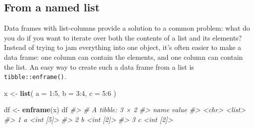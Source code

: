\documentclass[]{book}
\newenvironment{Shaded}{\begin{snugshade}}{\end{snugshade}}
\newcommand{\KeywordTok}[1]{\textcolor[rgb]{0.13,0.29,0.53}{\textbf{{#1}}}}
\newcommand{\DataTypeTok}[1]{\textcolor[rgb]{0.13,0.29,0.53}{{#1}}}
\newcommand{\DecValTok}[1]{\textcolor[rgb]{0.00,0.00,0.81}{{#1}}}
\newcommand{\FloatTok}[1]{\textcolor[rgb]{0.00,0.00,0.81}{{#1}}}
\newcommand{\StringTok}[1]{\textcolor[rgb]{0.31,0.60,0.02}{{#1}}}
\newcommand{\CommentTok}[1]{\textcolor[rgb]{0.56,0.35,0.01}{\textit{{#1}}}}
\newcommand{\NormalTok}[1]{{#1}}
\begin{document}
\begin{Shaded}
\end{Shaded}

\subsection{From a named list}\label{from-a-named-list}

Data frames with list-columns provide a solution to a common problem:
what do you do if you want to iterate over both the contents of a list
and its elements? Instead of trying to jam everything into one object,
it's often easier to make a data frame: one column can contain the
elements, and one column can contain the list. An easy way to create
such a data frame from a list is \texttt{tibble::enframe()}.

\begin{Shaded}
\begin{Highlighting}[]
\NormalTok{x <-}\StringTok{ }\KeywordTok{list}\NormalTok{(}
  \DataTypeTok{a =} \DecValTok{1}\NormalTok{:}\DecValTok{5}\NormalTok{,}
  \DataTypeTok{b =} \DecValTok{3}\NormalTok{:}\DecValTok{4}\NormalTok{, }
  \DataTypeTok{c =} \DecValTok{5}\NormalTok{:}\DecValTok{6}
\NormalTok{) }

\NormalTok{df <-}\StringTok{ }\KeywordTok{enframe}\NormalTok{(x)}
\NormalTok{df}
\CommentTok{#> # A tibble: 3 × 2}
\CommentTok{#>    name     value}
\CommentTok{#>   <chr>    <list>}
\CommentTok{#> 1     a <int [5]>}
\CommentTok{#> 2     b <int [2]>}
\CommentTok{#> 3     c <int [2]>}
\end{Highlighting}
\end{Shaded}
\end{document}
